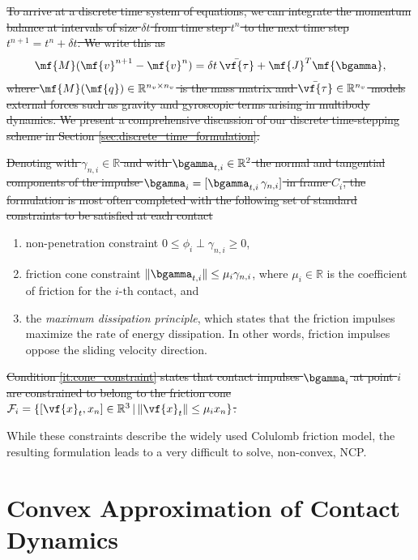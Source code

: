\sout{To arrive at a discrete time system of equations, we can integrate the momentum
balance at intervals of size $\delta t$ from time step $t^n$ to the next time
step $t^{n+1}=t^n+\delta t$. We write this as}
\begin{eqnarray}
	\mf{M}(\mf{v}^{n+1}-\mf{v}^n)  = \delta t\,\bar{\vf{\tau}} +
	\mf{J}^T\mf{\bgamma},
	\label{eq:momentum_balance}
\end{eqnarray}
\sout{where $\mf{M}(\mf{q})\in\mathbb{R}^{n_v\times n_v}$ is the mass matrix and
$\bar{\vf{\tau}}\in\mathbb{R}^{n_v}$ models external forces such as gravity and
gyroscopic terms arising in multibody dynamics. We present a comprehensive
discussion of our discrete time-stepping scheme in Section
\ref{sec:discrete_time_formulation}.}

\sout{Denoting with $\gamma_{n,i} \in \mathbb{R}$ and with $\bgamma_{t,i} \in
\mathbb{R}^2$ the normal and tangential components of the impulse
$\bgamma_i=[\bgamma_{t,i}\,\gamma_{n,i}]$ in frame $C_i$, the formulation is
most often completed with the following set of standard constraints to be
satisfied at each contact}
\begin{enumerate}
	\item non-penetration constraint $0\le\phi_i\perp\gamma_{n,i}\ge0$,
	\item\label{it:cone_constraint} friction cone constraint
	$\Vert\bgamma_{t,i}\Vert\le \mu_i\gamma_{n,i}$, where $\mu_i \in \mathbb{R}$
	is the coefficient of friction for the $i\text{-th}$ contact, and
	\item the \emph{maximum dissipation principle}, which states that the
	friction impulses maximize the rate of energy dissipation. In other words,
	friction impulses oppose the sliding velocity direction.
\end{enumerate}
\sout{Condition \ref{it:cone_constraint} states that contact impulses $\bgamma_i$ at
point $i$ are constrained to belong to the friction cone
$\mathcal{F}_i=\{[\vf{x}_t, x_n] \in\mathbb{R}^3 \,|\, \Vert\vf{x}_t\Vert\le
\mu_i x_n\}$.}

While these constraints describe the widely used Colulomb friction model, the
resulting formulation leads to a very difficult to solve, non-convex, NCP.

\section{Convex Approximation of Contact Dynamics}
\label{sec:convex_approximation}

